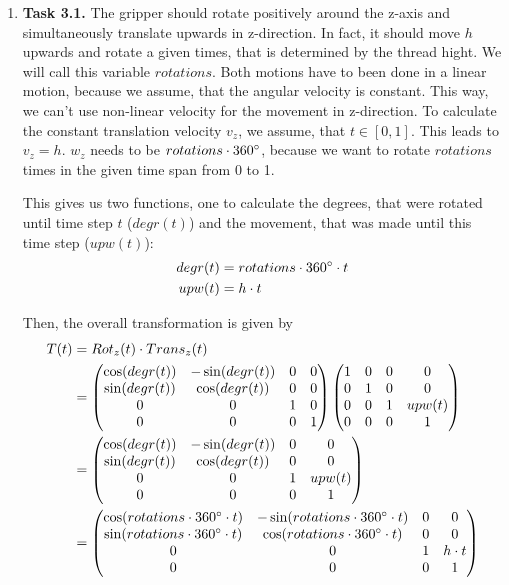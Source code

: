 \documentclass[a4paper,11pt]{article}
\author{\authorinfo}
\title{\titleinfo}
\date{\today}
\begin{document}
\maketitle
\begin {enumerate}
\item[\textbf{Task 3.1.}] The gripper should rotate positively around the z-axis and simultaneously translate upwards in z-direction. In fact, it should move $h$ upwards and rotate a given times, that is determined by the thread hight. We will call this variable $rotations$. Both motions have to been done in a linear motion, because we assume, that the angular velocity is constant. This way, we can't use non-linear velocity for the movement in z-direction. To calculate the constant translation velocity $v_z$, we assume, that $t \in [0,1]$. This leads to $v_z = h$. $w_z$ needs to be $rotations \cdot 360\degree$, because we want to rotate $rotations$ times in the given time span from 0 to 1.

This gives us two functions, one to calculate the degrees, that were rotated until time step $t$ ($degr(t)$) and the movement, that was made until this time step ($upw(t)$):
\begin{align*}
  degr(t) &= rotations \cdot 360\degree \cdot t\\
  upw(t) &= h \cdot t
\end{align*}

Then, the overall transformation is given by
\begin{align*}
  T(t) &= Rot_{z}(t) \cdot Trans_{z}(t)\\
  &=
    \begin{pmatrix}
      \cos(degr(t)) & -\sin(degr(t)) & 0 & 0\\
      \sin(degr(t)) & \cos(degr(t)) & 0 & 0\\
      0 & 0 & 1 & 0\\
      0 & 0 & 0 & 1
    \end{pmatrix} \begin{pmatrix}
      1 & 0 & 0 & 0\\
      0 & 1 & 0 & 0\\
      0 & 0 & 1 & upw(t)\\
      0 & 0 & 0 & 1
    \end{pmatrix}\\
  &= \begin{pmatrix}
    \cos(degr(t)) & -\sin(degr(t)) & 0 & 0\\
    \sin(degr(t)) & \cos(degr(t)) & 0 & 0\\
    0 & 0 & 1 & upw(t)\\
    0 & 0 & 0 & 1
  \end{pmatrix}\\
  &= \begin{pmatrix}
    \cos(rotations \cdot 360\degree \cdot t) & -\sin(rotations \cdot 360\degree \cdot t) & 0 & 0\\
    \sin(rotations \cdot 360\degree \cdot t) & \cos(rotations \cdot 360\degree \cdot t) & 0 & 0\\
    0 & 0 & 1 & h \cdot t\\
    0 & 0 & 0 & 1
  \end{pmatrix}
\end{align*}



\end{enumerate}
\end{document}
